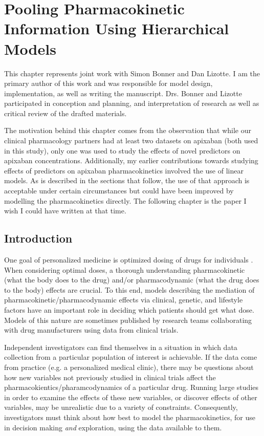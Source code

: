 \chapter{Pooling Pharmacokinetic Information Using Hierarchical Models}


This chapter represents joint work with Simon Bonner and Dan Lizotte.  I am the primary author of this work and was responsible for model design, implementation, as well as writing the manuscript.  Drs. Bonner and Lizotte participated in conception and planning, and interpretation of research as well as critical review of the drafted materials.

The motivation behind this chapter comes from the observation that while our clinical pharmacology partners had at least two datasets on apixaban (both used in this study), only one was used to study the effects of novel predictors on apixaban concentrations.  Additionally, my earlier contributions towards studying effects of predictors on apixaban pharmacokinetics involved the use of linear models.  As is described in the sections that follow, the use of that approach is acceptable under certain circumstances but could have been improved by modelling the pharmacokinetics directly.  The following chapter is the paper I wish I could have written at that time.

\section{Introduction}

One goal of personalized medicine is optimized dosing of drugs for individuals \cite{morse2015personalized}.  When considering optimal doses, a thorough understanding pharmacokinetic (what the body does to the drug) and/or pharmacodynamic (what the drug does to the body) effects are crucial.  To this end, models describing the mediation of pharmacokinetic/pharmacodynamic effects via clinical, genetic, and lifestyle factors have an important role in deciding which patients should get what dose. Models of this nature are sometimes published by research teams collaborating with drug manufacturers using data from clinical trials.

Independent investigators can find themselves in a situation in which data collection from a particular population of interest is achievable. If the data come from practice (e.g. a personalized medical clinic), there may be questions about how new variables not previously studied in clinical trials affect the pharmacokientics/pharamcodynamics of a particular drug.  Running large studies in order to examine the effects of these new variables, or discover effects of other variables, may be unrealistic due to a variety of constraints.  Consequently, investigators must think about how best to model the pharmacokinetics, for use in decision making \textit{and} exploration, using the data available to them.

